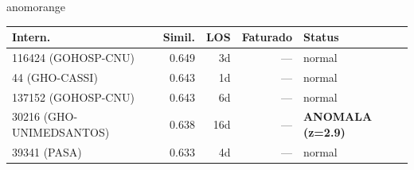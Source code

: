 \documentclass[a4paper,10pt]{article}
\begin{document}
\begin{anomalycard}[Internacao 165960 | GHO-PETROBRAS | ALTO (z=3.99)]{anomorange}
\begin{tabular}{l r r r l}\toprule\textbf{Intern.} & \textbf{Simil.} & \textbf{LOS} & \textbf{Faturado} & \textbf{Status} \\\midrule
116424 (GOHOSP-CNU) & 0.649 & 3d & --- & \textcolor{jcubeblue}{normal} \\
44 (GHO-CASSI) & 0.643 & 1d & --- & \textcolor{jcubeblue}{normal} \\
137152 (GOHOSP-CNU) & 0.643 & 6d & --- & \textcolor{jcubeblue}{normal} \\
30216 (GHO-UNIMEDSANTOS) & 0.638 & 16d & --- & \textcolor{anomred}{\textbf{ANOMALA (z=2.9)}} \\
39341 (PASA) & 0.633 & 4d & --- & \textcolor{jcubeblue}{normal} \\
\bottomrule\end{tabular}


\end{anomalycard}

\newpage
\end{document}
